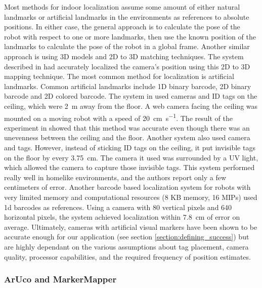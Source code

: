 \documentclass{article}
\begin{document}
    Most methods for indoor localization assume some amount of either natural landmarks or artificial landmarks in the environments as references to absolute positions. In either case, the general approach is to calculate the pose of the robot with respect to one or more landmarks, then use the known position of the landmarks to calculate the pose of the robot in a global frame. Another similar approach is using 3D models and 2D to 3D matching techniques. The system described in \cite{sattler_fast_2011} had accurately localized the camera's position using this 2D to 3D mapping technique. The most common method for localization is artificial landmarks. Common artificial landmarks include 1D binary barcode, 2D binary barcode and 2D colored barcode. The system in \cite{lin_localization_2004} used cameras and ID tags on the ceiling, which were \SI{2}{\meter} away from the floor. A web camera facing the ceiling was mounted on a moving robot with a speed of \SI{20}{\centi\meter\per\second}. The result of the experiment in \cite{lin_localization_2004} showed that this method was accurate even though there was an unevenness between the ceiling and the floor. Another system \cite{huh_mobile_2007} also used camera and tags. However, instead of sticking ID tags on the ceiling, it put invisible tags on the floor by every \SI{3.75}{\centi\meter}. The camera it used was surrounded by a UV light, which allowed the camera to capture those invisible tags. This system performed really well in homelike environments, and the authors report only a few centimeters of error. Another barcode based localization system for robots with very limited memory and computational resources (8 KB memory, 16 MIPs) \cite{dias_barcode-based_2012} used 1d barcodes as references. Using a camera with 80 vertical pixels and 640 horizontal pixels, the system achieved localization within \SI{7.8}{\centi\meter} of error on average. Ultimately, cameras with artificial visual markers have been shown to be accurate enough for our application (see section \ref{section:defining_success}) but are highly dependant on the various assumptions about tag placement, camera quality, processor capabilities, and the required frequency of position estimates.

    \subsubsection{ArUco and MarkerMapper}
\end{document}
